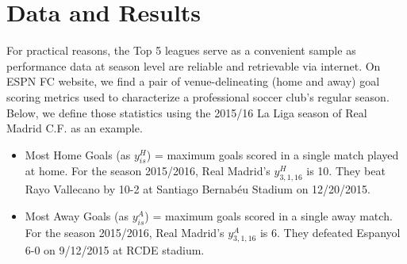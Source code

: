 \documentclass[]{interact}
\theoremstyle{plain}%
\theoremstyle{definition}
\theoremstyle{remark}
\begin{document}




\section{Data and Results} 

For practical reasons, the Top 5 leagues serve as a convenient sample as performance data at season level are reliable and retrievable via internet.  On ESPN FC website, we find a pair of venue-delineating (home and away) goal scoring metrics used to characterize a professional soccer club's regular season. Below, we define those statistics using the 2015/16 La Liga season of Real Madrid C.F. as an example.

\begin{itemize}
	\item Most Home Goals (as $y^H_{is}$) = maximum goals scored in a single match played at home. For the season 2015/2016, Real Madrid’s $y^H_{3,1,16}$ is 10. They beat Rayo Vallecano by 10-2 at Santiago Bernabéu Stadium on 12/20/2015.
	\item Most Away Goals (as $y^A_{is}$) = maximum goals scored in a single away match. For the season 2015/2016, Real Madrid’s $y^A_{3,1,16}$ is 6. They defeated Espanyol 6-0 on 9/12/2015 at RCDE stadium.
\end{itemize}
\end{document}
